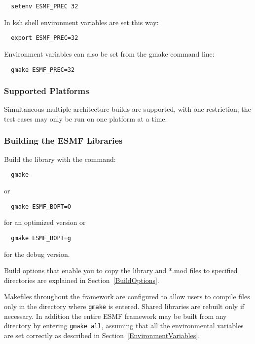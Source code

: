 \begin{verbatim}
  setenv ESMF_PREC 32
\end{verbatim}

In ksh shell environment variables are set this way:

\begin{verbatim}
  export ESMF_PREC=32
\end{verbatim}

Environment variables can also be set from the gmake command line:

\begin{verbatim}
  gmake ESMF_PREC=32
\end{verbatim}

\subsubsection{Supported Platforms}


Simultaneous multiple architecture builds are supported, with
one restriction; the test cases may only be run on one platform at a time. 

\subsubsection{Building the ESMF Libraries}
\label{BuildESMF}



Build the library with the command:
\begin{verbatim}
  gmake 
\end{verbatim}
or 
\begin{verbatim}
  gmake ESMF_BOPT=O
\end{verbatim}
  for an optimized version or
\begin{verbatim}
  gmake ESMF_BOPT=g  
\end{verbatim}
  for the debug version.

Build options that enable you to copy the library and *.mod files to
specified directories are explained in Section~\ref{BuildOptions}. 

Makefiles throughout the framework are configured to allow users to
compile files only in the directory where {\tt gmake} is entered. Shared
libraries are rebuilt only if necessary. In addition the entire ESMF
framework may be built from any directory by entering {\tt gmake all},
assuming that all the environmental variables are set correctly as
described in Section~\ref{EnvironmentVariables}.

